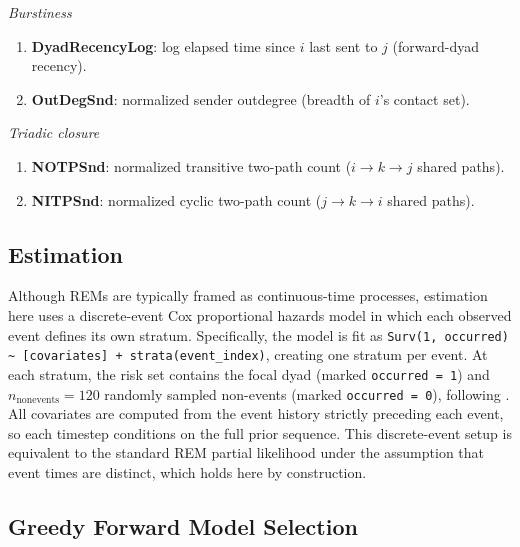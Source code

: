 \documentclass[11pt]{article}
\begin{document}
\noindent\textit{Burstiness}
\begin{enumerate}[leftmargin=2em,resume]
  \item \textbf{DyadRecencyLog}: log elapsed time since $i$ last sent to $j$
        (forward-dyad recency).
  \item \textbf{OutDegSnd}: normalized sender outdegree (breadth of $i$'s
        contact set).
\end{enumerate}

\noindent\textit{Triadic closure}
\begin{enumerate}[leftmargin=2em,resume]
  \item \textbf{NOTPSnd}: normalized transitive two-path count
        ($i \to k \to j$ shared paths).
  \item \textbf{NITPSnd}: normalized cyclic two-path count
        ($j \to k \to i$ shared paths).
\end{enumerate}

\subsection{Estimation}

Although REMs are typically framed as continuous-time processes, estimation here
uses a discrete-event Cox proportional hazards model in which each observed event
defines its own stratum. Specifically, the model is fit as
\texttt{Surv(1, occurred) \textasciitilde{} [covariates] + strata(event\_index)},
creating one stratum per event. At each stratum, the risk set contains the focal
dyad (marked \texttt{occurred = 1}) and $n_{\text{nonevents}} = 120$ randomly
sampled non-events (marked \texttt{occurred = 0}), following
\citet{lerner2020reliability}. All covariates are computed from the event history
strictly preceding each event, so each timestep conditions on the full prior
sequence. This discrete-event setup is equivalent to the standard REM partial
likelihood under the assumption that event times are distinct, which holds here
by construction.

\subsection{Greedy Forward Model Selection}
\end{document}
